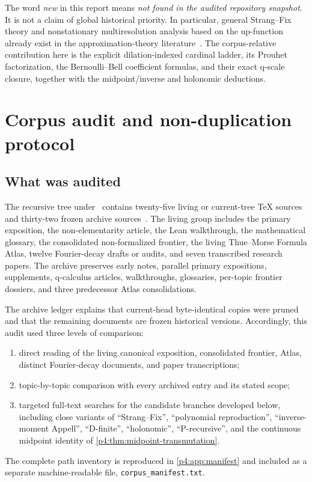 \documentclass[11pt]{article}
\numberwithin{equation}{section}
\theoremstyle{definition}
\theoremstyle{remark}
\begin{document}
\begin{tcolorbox}[colback=lightorange,colframe=conjorange,title=Priority and novelty disclaimer,fonttitle=\bfseries]
The word \emph{new} in this report means \emph{not found in the audited repository snapshot}.  It is not a claim of global historical priority.  In particular, general Strang--Fix theory and nonstationary multiresolution analysis based on the up-function already exist in the approximation-theory literature~\cite{p4:strangFix,p4:dynRon,p4:liShen}.  The corpus-relative contribution here is the explicit dilation-indexed cardinal ladder, its Prouhet factorization, the Bernoulli--Bell coefficient formulas, and their exact q-scale closure, together with the midpoint/inverse and holonomic deductions.
\end{tcolorbox}


\newpage

\section{Corpus audit and non-duplication protocol}
\label{p4:sec:audit}

\subsection{What was audited}
The recursive tree under \repo\ contains twenty-five living or current-tree TeX sources and thirty-two frozen archive sources~\cite{p4:proveit,p4:primary,p4:frontier,p4:atlas}.  The living group includes the primary exposition, the non-elementarity article, the Lean walkthrough, the mathematical glossary, the consolidated non-formalized frontier, the living Thue--Morse Formula Atlas, twelve Fourier-decay drafts or audits, and seven transcribed research papers.  The archive preserves early notes, parallel primary expositions, supplements, q-calculus articles, walkthroughs, glossaries, per-topic frontier dossiers, and three predecessor Atlas consolidations.

The archive ledger explains that current-head byte-identical copies were pruned and that the remaining documents are frozen historical versions.  Accordingly, this audit used three levels of comparison:
\begin{enumerate}
\item direct reading of the living canonical exposition, consolidated frontier, Atlas, distinct Fourier-decay documents, and paper transcriptions;
\item topic-by-topic comparison with every archived entry and its stated scope;
\item targeted full-text searches for the candidate branches developed below, including close variants of ``Strang--Fix'', ``polynomial reproduction'', ``inverse-moment Appell'', ``D-finite'', ``holonomic'', ``P-recursive'', and the continuous midpoint identity of \cref{p4:thm:midpoint-transmutation}.
\end{enumerate}
The complete path inventory is reproduced in \cref{p4:app:manifest} and included as a separate machine-readable file, \texttt{corpus\_manifest.txt}.
\end{document}
